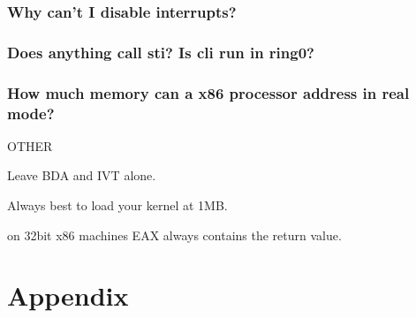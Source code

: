 \documentclass[oneside,english,final]{amsbook}
\begin{document}
\section{Why can't I disable interrupts?}

\section{Does anything call sti? Is cli run in ring0?}

\section{How much memory can a x86 processor address in real mode?}


OTHER

Leave BDA and IVT alone.

Always best to load your kernel at 1MB.


on 32bit x86 machines EAX always contains the return value.

\appendix
\part{Appendix}


\nocite{*}


\printglossaries

\listoffigures
\listoftables
\end{document}
